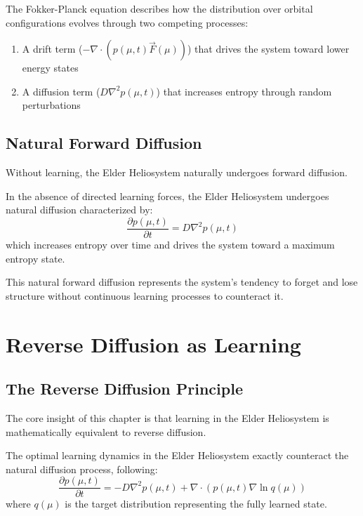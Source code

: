 The Fokker-Planck equation describes how the distribution over orbital configurations evolves through two competing processes:

\begin{enumerate}
    \item A drift term ($-\nabla \cdot (p(\mu, t) \vec{F}(\mu))$) that drives the system toward lower energy states
    \item A diffusion term ($D \nabla^2 p(\mu, t)$) that increases entropy through random perturbations
\end{enumerate}

\subsection{Natural Forward Diffusion}

Without learning, the Elder Heliosystem naturally undergoes forward diffusion.

\begin{theorem}
In the absence of directed learning forces, the Elder Heliosystem undergoes natural diffusion characterized by:
\begin{equation}
\frac{\partial p(\mu, t)}{\partial t} = D \nabla^2 p(\mu, t)
\end{equation}
which increases entropy over time and drives the system toward a maximum entropy state.
\end{theorem}

This natural forward diffusion represents the system's tendency to forget and lose structure without continuous learning processes to counteract it.

\section{Reverse Diffusion as Learning}

\subsection{The Reverse Diffusion Principle}

The core insight of this chapter is that learning in the Elder Heliosystem is mathematically equivalent to reverse diffusion.

\begin{theorem}
The optimal learning dynamics in the Elder Heliosystem exactly counteract the natural diffusion process, following:
\begin{equation}
\frac{\partial p(\mu, t)}{\partial t} = -D \nabla^2 p(\mu, t) + \nabla \cdot (p(\mu, t) \nabla \ln q(\mu))
\end{equation}
where $q(\mu)$ is the target distribution representing the fully learned state.
\end{theorem}


